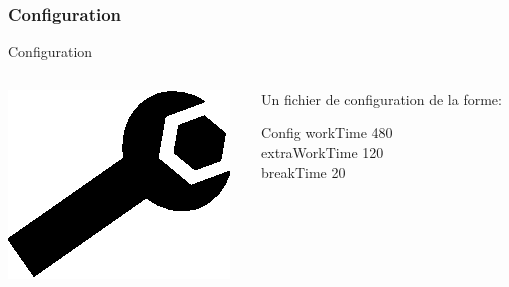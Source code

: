 \documentclass[xcolor=x11names,12pt,compress]{beamer}
\begin{document}
\subsubsection{Configuration}
\begin{frame}{Configuration}
    \begin{columns}
        \begin{column}{0.3\textwidth}
            \includegraphics{pince.eps}
        \end{column}
        \begin{column}{0.7\textwidth}
    Un fichier de configuration de la forme:
    \begin{block}{Config}
        workTime 480\\
        extraWorkTime 120\\
        breakTime 20
    \end{block}
        \end{column}
    \end{columns}
\end{frame}
\end{document}
